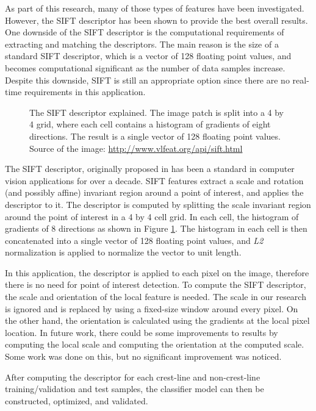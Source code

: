 As part of this research, many of those types of features have been investigated. However, the SIFT descriptor has been shown to provide the best overall results. One downside of the SIFT descriptor is the computational requirements of extracting and matching the descriptors. The main reason is the size of a standard SIFT descriptor, which is a vector of 128 floating point values, and becomes computational significant as the number of data samples increase. Despite this downside, SIFT is still an appropriate option since there are no real-time requirements in this application.

\begin{figure}
	\centering
	\caption{The SIFT descriptor explained. The image patch is split into a 4 by 4 grid, where each cell contains a histogram of gradients of eight directions. The result is a single vector of 128 floating point values. Source of the image: \underline{http://www.vlfeat.org/api/sift.html}}
	\label{fig:sift_descriptor}
\end{figure}

The SIFT descriptor, originally proposed in \cite{lowe_sift_paper} has been a standard in computer vision applications for over a decade. SIFT features extract a scale and rotation (and possibly affine) invariant region around a point of interest, and applies the descriptor to it. The descriptor is computed by splitting the scale invariant region around the point of interest in a 4 by 4 cell grid. In each cell, the histogram of gradients of 8 directions as shown in Figure \ref{fig:sift_descriptor}. The histogram in each cell is then concatenated into a single vector of 128 floating point values, and \emph{L2} normalization is applied to normalize the vector to unit length.   

In this application, the descriptor is applied to each pixel on the image, therefore there is no need for point of interest detection. To compute the SIFT descriptor, the scale and orientation of the local feature is needed. The scale in our research is ignored and is replaced by using a fixed-size window around every pixel. On the other hand, the orientation is calculated using the gradients at the local pixel location. In future work, there could be some improvements to results by computing the local scale and computing the orientation at the computed scale. Some work was done on this, but no significant improvement was noticed.

After computing the descriptor for each crest-line and non-crest-line training/validation and test samples, the classifier model can then be constructed, optimized, and validated.

